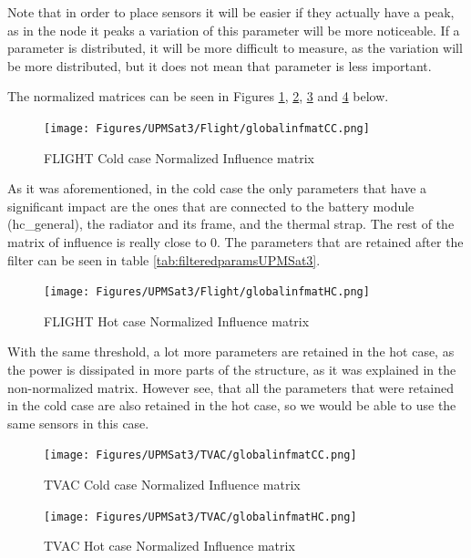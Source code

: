 Note that in order to place sensors it will be easier if they actually have a peak, as in the node it peaks a variation of this parameter will be more noticeable. If a parameter is distributed, it will be more difficult to measure, as the variation will be more distributed, but it does not mean that parameter is less important. 

The normalized matrices can be seen in Figures \ref{fig:FCC-globalinf}, \ref{fig:FHC-globalinf}, \ref{fig:TCC-globalinf} and \ref{fig:THC-globalinf} below.
\begin{figure}[H]
    \centering
    \texttt{[image: Figures/UPMSat3/Flight/globalinfmatCC.png]}
    \caption{FLIGHT Cold case Normalized Influence matrix}
    \label{fig:FCC-globalinf}
\end{figure}
As it was aforementioned, in the cold case the only parameters that have a significant impact are the ones that are connected to the battery module (hc\_general), the radiator and its frame, and the thermal strap. The rest of the matrix of influence is really close to 0. The parameters that are retained after the filter can be seen in table \autoref{tab:filteredparamsUPMSat3}. 
\begin{figure}[H]
    \centering
    \texttt{[image: Figures/UPMSat3/Flight/globalinfmatHC.png]}
    \caption{FLIGHT Hot case Normalized Influence matrix}
    \label{fig:FHC-globalinf}   
\end{figure}
With the same threshold, a lot more parameters are retained in the hot case, as the power is dissipated in more parts of the structure, as it was explained in the non-normalized matrix. However see, that all the parameters that were retained in the cold case are also retained in the hot case, so we would be able to use the same sensors in this case.
\begin{figure}[H]
    \centering
    \texttt{[image: Figures/UPMSat3/TVAC/globalinfmatCC.png]}
    \caption{TVAC Cold case Normalized Influence matrix}
    \label{fig:TCC-globalinf}
\end{figure}

\begin{figure}[H]
    \centering
    \texttt{[image: Figures/UPMSat3/TVAC/globalinfmatHC.png]}
    \caption{TVAC Hot case Normalized Influence matrix}
    \label{fig:THC-globalinf}
\end{figure}



